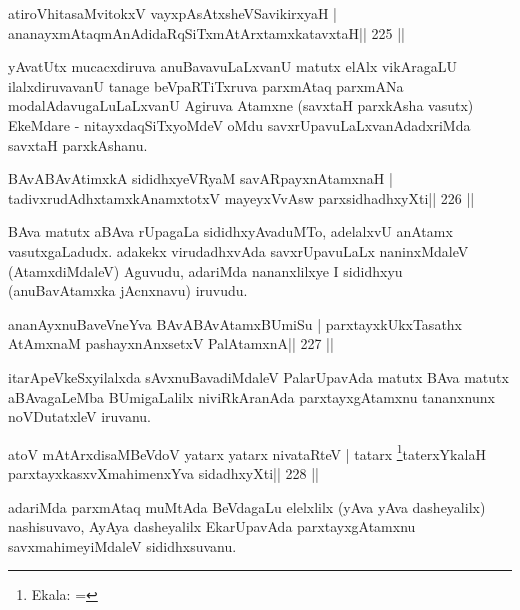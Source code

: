 
\begin{shl}
atiroVhitasaMvitokxV vayxpAsAtxsheVSavikirxyaH |
ananayxmAtaqmAnAdidaRqSiTxmAtArxtamxkatavxtaH\hfill || 225 ||
\end{shl}

\begin{artha}
yAvatUtx mucacxdiruva anuBavavuLaLxvanU matutx elAlx vikAragaLU ilalxdiruvavanU tanage beVpaRTiTxruva parxmAtaq parxmANa modalAdavugaLuLaLxvanU Agiruva Atamxne (savxtaH parxkAsha vasutx) EkeMdare - nitayxdaqSiTxyoMdeV oMdu savxrUpavuLaLxvanAdadxriMda savxtaH parxkAshanu.
\end{artha}

\begin{shl}
BAvABAvAtimxkA sididhxyeVRyaM savAR\s payxnAtamxnaH |
tadivxrudAdhxtamxkAnamxtotxV mayeyxVvAsw parxsidhadhxyXti\hfill || 226 ||
\end{shl}

\begin{artha}
BAva matutx aBAva rUpagaLa sididhxyAvaduMTo, adelalxvU anAtamx vasutxgaLadudx. adakekx virudadhxvAda savxrUpavuLaLx naninxMdaleV (AtamxdiMdaleV) Aguvudu, adariMda nananxlilxye I sididhxyu (anuBavAtamxka jAcnxnavu) iruvudu.
\end{artha}

\begin{shl}
ananAyxnuBaveVneYva BAvABAvAtamxBUmiSu |
parxtayxkUkxTasathx AtAmxnaM pashayxnAnxsetxV PalAtamxnA\hfill || 227 ||
\end{shl}

\begin{artha}
itarApeVkeSxyilalxda sAvxnuBavadiMdaleV PalarUpavAda matutx BAva matutx aBAvagaLeMba BUmigaLalilx niviRkAranAda parxtayxgAtamxnu tananxnunx noVDutatxleV iruvanu.
\end{artha}


\begin{shl}
atoV mAtArxdisaMBeVdoV yatarx yatarx nivataRteV |
tatarx \footnote{Ekala: =}taterxYkalaH parxtayxkasxvXmahimenxYva sidadhxyXti\hfill || 228 ||
\end{shl}

\begin{artha}
adariMda parxmAtaq muMtAda BeVdagaLu elelxlilx (yAva yAva dasheyalilx) nashisuvavo, AyAya dasheyalilx EkarUpavAda parxtayxgAtamxnu savxmahimeyiMdaleV sididhxsuvanu.
\end{artha}

